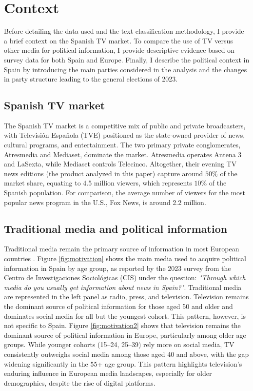 \documentclass[12pt]{article}
\begin{document}
	\section{Context}
	
	Before detailing the data used and the text classification methodology, I provide a brief context on the Spanish TV market. To compare the use of TV versus other media for political information, I provide descriptive evidence based on survey data for both Spain and Europe. Finally, I describe the political context in Spain by introducing the main parties considered in the analysis and the changes in party structure leading to the general elections of 2023.
	
	\label{section:context}
	
	\subsection*{Spanish TV market}
	
	The Spanish TV market is a competitive mix of public and private broadcasters, with Televisión Española (TVE) positioned as the state-owned provider of news, cultural programs, and entertainment. The two primary private conglomerates, Atresmedia and Mediaset, dominate the market. Atresmedia operates Antena 3 and LaSexta, while Mediaset controls Telecinco. Altogether, their evening TV news editions (the product analyzed in this paper) capture around $50\%$ of the market share, equating to 4.5 million viewers, which represents $10\%$ of the Spanish population. For comparison, the average number of viewers for the most popular news program in the U.S., Fox News, is around 2.2 million.
	
	\subsection*{Traditional media and political information}
	
	Traditional media remain the primary source of information in most European countries \citep{europarl2024}. Figure \ref{fig:motivation} shows the main media used to acquire political information in Spain by age group, as reported by the 2023 survey from the Centro de Investigaciones Sociológicas (CIS) under the question: \textit{"Through which media do you usually get information about news in Spain?"}. Traditional media are represented in the left panel as radio, press, and television. Television remains the dominant source of political information for those aged 50 and older and dominates social media for all but the youngest cohort. This pattern, however, is not specific to Spain. Figure \ref{fig:motivation2} shows that television remains the dominant source of political information in Europe, particularly among older age groups. While younger cohorts (15--24, 25--39) rely more on social media, TV consistently outweighs social media among those aged 40 and above, with the gap widening significantly in the 55+ age group. This pattern highlights television’s enduring influence in European media landscapes, especially for older demographics, despite the rise of digital platforms.
	
\end{document}
